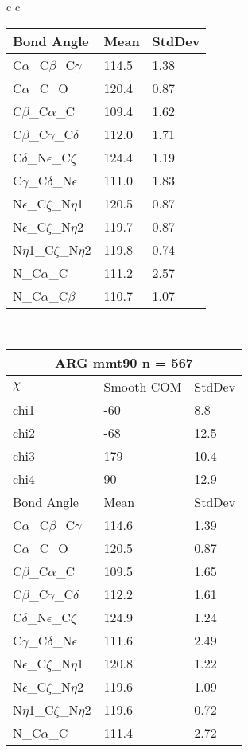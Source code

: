 \begin{longtable}{ c c }
\begin{tabular}{ l l l }
  Bond Angle   & Mean     & StdDev \\ \midrule
  C$\alpha$\_C$\beta$\_C$\gamma$ & 114.5 & 1.38\\
  C$\alpha$\_C\_O & 120.4 & 0.87\\
  C$\beta$\_C$\alpha$\_C & 109.4 & 1.62\\
  C$\beta$\_C$\gamma$\_C$\delta$ & 112.0 & 1.71\\
  C$\delta$\_N$\epsilon$\_C$\zeta$ & 124.4 & 1.19\\
  C$\gamma$\_C$\delta$\_N$\epsilon$ & 111.0 & 1.83\\
  N$\epsilon$\_C$\zeta$\_N$\eta$1 & 120.5 & 0.87\\
  N$\epsilon$\_C$\zeta$\_N$\eta$2 & 119.7 & 0.87\\
  N$\eta$1\_C$\zeta$\_N$\eta$2 & 119.8 & 0.74\\
  N\_C$\alpha$\_C & 111.2 & 2.57\\
  N\_C$\alpha$\_C$\beta$ & 110.7 & 1.07\\
  \bottomrule
  \end{tabular}
  \\
  \begin{tabular}{ l l l }
  \toprule
  \multicolumn{3}{c}{ARG \textbf{mmt90} n = 567} \\ \toprule
  $\chi$       & Smooth COM & StdDev \\ \midrule
  chi1 & -60 & 8.8 \\ 
  chi2 & -68 & 12.5 \\ 
  chi3 & 179 & 10.4 \\ 
  chi4 & 90 & 12.9 \\ \midrule
  Bond Angle   & Mean     & StdDev \\ \midrule
  C$\alpha$\_C$\beta$\_C$\gamma$ & 114.6 & 1.39\\
  C$\alpha$\_C\_O & 120.5 & 0.87\\
  C$\beta$\_C$\alpha$\_C & 109.5 & 1.65\\
  C$\beta$\_C$\gamma$\_C$\delta$ & 112.2 & 1.61\\
  C$\delta$\_N$\epsilon$\_C$\zeta$ & 124.9 & 1.24\\
  C$\gamma$\_C$\delta$\_N$\epsilon$ & 111.6 & 2.49\\
  N$\epsilon$\_C$\zeta$\_N$\eta$1 & 120.8 & 1.22\\
  N$\epsilon$\_C$\zeta$\_N$\eta$2 & 119.6 & 1.09\\
  N$\eta$1\_C$\zeta$\_N$\eta$2 & 119.6 & 0.72\\
  N\_C$\alpha$\_C & 111.4 & 2.72\\

\end{tabular}
\end{longtable}
